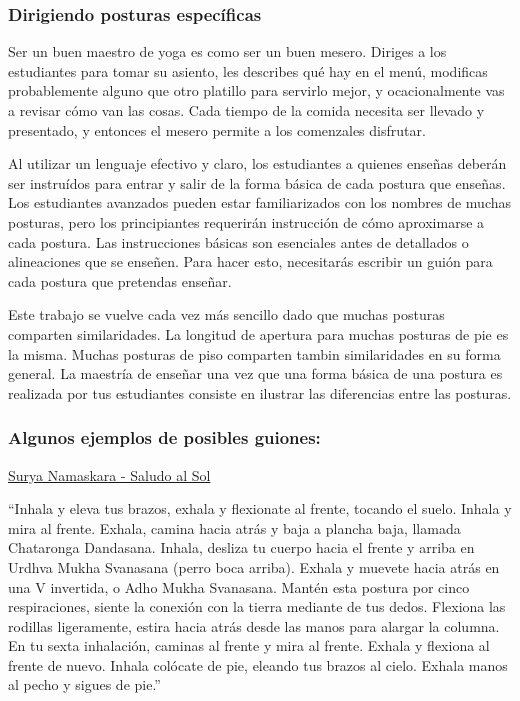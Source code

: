 \subsubsection{Dirigiendo posturas específicas}
Ser un buen maestro de yoga es como ser un buen mesero. Diriges a los estudiantes para tomar su asiento, les describes qu\'e hay en el menú, modificas probablemente alguno que otro platillo para servirlo mejor, y ocacionalmente vas a revisar cómo van las cosas. Cada tiempo de la comida necesita ser llevado y presentado, y entonces el mesero permite a los comenzales disfrutar.

Al utilizar un lenguaje efectivo y claro, los estudiantes a quienes enseñas deberán ser instruídos para entrar y salir de la forma básica de cada postura que enseñas. Los estudiantes avanzados pueden estar familiarizados con los nombres de muchas posturas, pero los principiantes requerirán instrucción de cómo aproximarse a cada postura. Las instrucciones básicas son esenciales antes de detallados o alineaciones que se enseñen. Para hacer esto, necesitarás escribir un guión para cada postura que pretendas enseñar.

Este trabajo se vuelve cada vez más sencillo dado que muchas posturas comparten similaridades. La longitud de apertura para muchas posturas de pie es la misma. Muchas posturas de piso comparten tambin similaridades en su forma general. La maestría de enseñar una vez que una forma básica de una postura es realizada por tus estudiantes consiste en ilustrar las diferencias entre las posturas.

\subsubsection{Algunos ejemplos de posibles guiones:}

\underline{Surya Namaskara - Saludo al Sol}

``Inhala y eleva tus brazos, exhala y flexionate al frente, tocando el suelo.
Inhala y mira al frente.
Exhala, camina hacia atrás y baja a plancha baja, llamada Chataronga Dandasana.
Inhala, desliza tu cuerpo hacia el frente y arriba en Urdhva Mukha Svanasana (perro boca arriba).
Exhala y muevete hacia atrás en una V invertida, o Adho Mukha Svanasana.
Mant\'en esta postura por cinco respiraciones, siente la conexión con la tierra mediante de tus dedos.
Flexiona las rodillas ligeramente, estira hacia atrás desde las manos para alargar la columna.
En tu sexta inhalación, caminas al frente y mira al frente.
Exhala y flexiona al frente de nuevo.
Inhala colócate de pie, eleando tus brazos al cielo.
Exhala manos al pecho y sigues de pie.''

